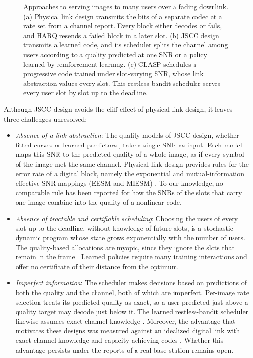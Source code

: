 \begin{figure}[!t]
\centering

\caption{Approaches to serving images to many users over a fading downlink. (a) Physical link
design transmits the bits of a separate codec at a rate set from a channel report. Every block
either decodes or fails, and HARQ resends a failed block in a later slot. (b) JSCC design transmits
a learned code, and its scheduler splits the channel among users according to a quality predicted
at one SNR or a policy learned by reinforcement learning. (c) CLASP schedules a progressive code
trained under slot-varying SNR, whose link abstraction values every slot. This restless-bandit
scheduler serves every user slot by slot up to the deadline.}
\label{fig:overview}
\end{figure}

Although JSCC design avoids the cliff effect of physical link design, it leaves three challenges
unresolved:
\begin{itemize}
\item \emph{Absence of a link abstraction}: The quality models of JSCC design, whether fitted curves
or learned predictors \cite{Yan22,Zhang23,Hou26}, take a single SNR as input. Each model maps this
SNR to the predicted quality of a whole image, as if every symbol of the image met the same channel.
Physical link design provides rules for the error rate of a digital block, namely the exponential
and mutual-information effective SNR mappings (EESM and MIESM) \cite{Ericsson03,EMD09}. To our
knowledge, no comparable rule has been reported for how the SNRs of the slots that carry one image
combine into the quality of a nonlinear code.
\item \emph{Absence of tractable and certifiable scheduling}: Choosing the users of every slot up to 
the deadline, without knowledge of future slots, is a stochastic dynamic program whose state grows
exponentially with the number of users. The quality-based allocations are myopic, since they ignore
the slots that remain in the frame \cite{Yan22,Xia24,Hou26}. Learned policies
\cite{Wang22,Zhang23t,McDowell26} require many training interactions and offer no certificate of
their distance from the optimum.
\item \emph{Imperfect information}: The scheduler makes decisions based on predictions of both the
quality and the channel, both of which are imperfect. Per-image rate selection \cite{Zhang23}
treats its predicted quality as exact, so a user predicted just above a quality target may decode
just below it. The learned restless-bandit scheduler likewise assumes exact channel knowledge
\cite{McDowell26}. Moreover, the advantage that motivates these designs was measured against an
idealized digital link with exact channel knowledge and capacity-achieving codes
\cite{Bourtsoulatze19,Kurka20}. Whether this advantage persists under the reports of a real base
station remains open.
\end{itemize}


